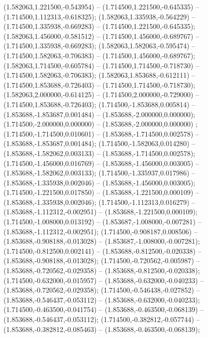  (1.582063,1.221500,-0.543954) -- (1.714500,1.221500,-0.645335) -- (1.714500,1.112313,-0.618325);
 (1.582063,1.335938,-0.564229) -- (1.714500,1.335938,-0.669283) -- (1.714500,1.221500,-0.645335);
 (1.582063,1.456000,-0.581512) -- (1.714500,1.456000,-0.689767) -- (1.714500,1.335938,-0.669283);
 (1.582063,1.582063,-0.595474) -- (1.714500,1.582063,-0.706383) -- (1.714500,1.456000,-0.689767);
 (1.582063,1.714500,-0.605784) -- (1.714500,1.714500,-0.718730) -- (1.714500,1.582063,-0.706383);
 (1.582063,1.853688,-0.612111) -- (1.714500,1.853688,-0.726403) -- (1.714500,1.714500,-0.718730);
 (1.582063,2.000000,-0.614125) -- (1.714500,2.000000,-0.729000) -- (1.714500,1.853688,-0.726403);
 (1.714500,-1.853688,0.005814) -- (1.853688,-1.853687,0.001484) -- (1.853688,-2.000000,0.000000);
 (1.714500,-2.000000,0.000000) -- (1.853688,-2.000000,0.000000) ;
 (1.714500,-1.714500,0.010601) -- (1.853688,-1.714500,0.002578) -- (1.853688,-1.853687,0.001484);
 (1.714500,-1.582063,0.014280) -- (1.853688,-1.582062,0.003133) -- (1.853688,-1.714500,0.002578);
 (1.714500,-1.456000,0.016769) -- (1.853688,-1.456000,0.003005) -- (1.853688,-1.582062,0.003133);
 (1.714500,-1.335937,0.017986) -- (1.853688,-1.335938,0.002046) -- (1.853688,-1.456000,0.003005);
 (1.714500,-1.221500,0.017850) -- (1.853688,-1.221500,0.000109) -- (1.853688,-1.335938,0.002046);
 (1.714500,-1.112313,0.016279) -- (1.853688,-1.112312,-0.002951) -- (1.853688,-1.221500,0.000109);
 (1.714500,-1.008000,0.013192) -- (1.853687,-1.008000,-0.007281) -- (1.853688,-1.112312,-0.002951);
 (1.714500,-0.908187,0.008506) -- (1.853688,-0.908188,-0.013028) -- (1.853687,-1.008000,-0.007281);
 (1.714500,-0.812500,0.002141) -- (1.853688,-0.812500,-0.020338) -- (1.853688,-0.908188,-0.013028);
 (1.714500,-0.720562,-0.005987) -- (1.853688,-0.720562,-0.029358) -- (1.853688,-0.812500,-0.020338);
 (1.714500,-0.632000,-0.015957) -- (1.853688,-0.632000,-0.040233) -- (1.853688,-0.720562,-0.029358);
 (1.714500,-0.546438,-0.027852) -- (1.853688,-0.546437,-0.053112) -- (1.853688,-0.632000,-0.040233);
 (1.714500,-0.463500,-0.041754) -- (1.853688,-0.463500,-0.068139) -- (1.853688,-0.546437,-0.053112);
 (1.714500,-0.382812,-0.057744) -- (1.853688,-0.382812,-0.085463) -- (1.853688,-0.463500,-0.068139);
